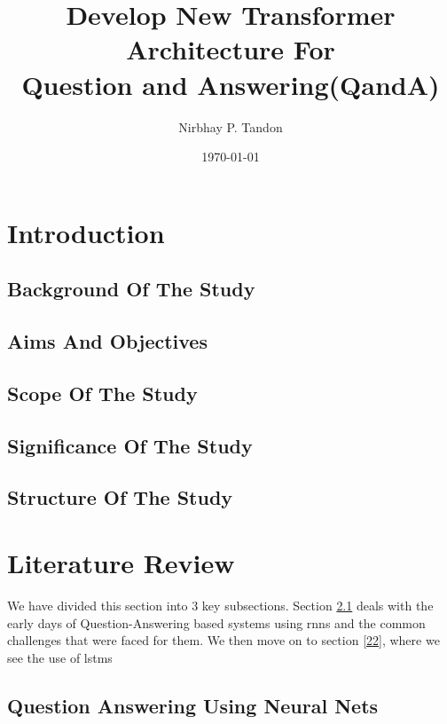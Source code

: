 \documentclass[12pt]{report}
\begin{document}
    \title{Develop New Transformer Architecture For \\ Question and Answering(QandA)}

    \author{Nirbhay P. Tandon}

    \date{\vfill \monthyeardate\today}
        \maketitle


    \newpage
    \newpage
    \tableofcontents
    \newpage
    \listoffigures
    \listoftables
    \newpage

    \chapter{\centering Introduction}\label{c1}
        \section{Background Of The Study}\label{11}
        \section{Aims And Objectives}\label{12}
        \section{Scope Of The Study}\label{13}
        \section{Significance Of The Study}\label{14}
        \section{Structure Of The Study}\label{15}
    \chapter{\centering Literature Review}\label{c2}

    We have divided this section into 3 key subsections. Section \ref{21} deals with the early days of Question-Answering based systems using \acrshort{rnns} and the common challenges that were faced for them. We then move on to section \ref{22}, where we see the use of \acrshort{lstms}
        \section{Question Answering Using Neural Nets}\label{21}
\end{document}
